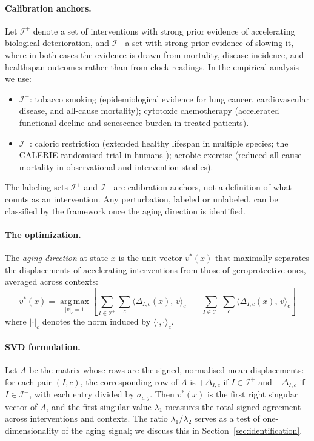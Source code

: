 \paragraph{Calibration anchors.}
Let $\mathcal{I}^+$ denote a set of interventions with strong prior evidence of
accelerating biological deterioration, and $\mathcal{I}^-$ a set with strong prior
evidence of slowing it, where in both cases the evidence is drawn from mortality,
disease incidence, and healthspan outcomes rather than from clock readings. In the
empirical analysis we use:
\begin{itemize}
  \item $\mathcal{I}^+$: tobacco smoking (epidemiological evidence for lung cancer,
    cardiovascular disease, and all-cause mortality); cytotoxic chemotherapy
    (accelerated functional decline and senescence burden in treated patients).
  \item $\mathcal{I}^-$: caloric restriction (extended healthy lifespan in multiple
    species; the CALERIE randomised trial in humans \cite{belsky2023calerie});
    aerobic exercise (reduced all-cause mortality in observational and intervention
    studies).
\end{itemize}

The labeling sets $\mathcal{I}^+$ and $\mathcal{I}^-$ are calibration anchors, not
a definition of what counts as an intervention. Any perturbation, labeled or
unlabeled, can be classified by the framework once the aging direction is identified.

\paragraph{The optimization.}
The \emph{aging direction} at state $x$ is the unit vector $v^*(x)$ that maximally
separates the displacements of accelerating interventions from those of geroprotective
ones, averaged across contexts:
\begin{equation}
  v^*(x) = \operatorname*{arg\,max}_{|v|_c = 1}
  \left[
    \sum_{I \in \mathcal{I}^+} \sum_c \langle \Delta_{I,c}(x),\, v \rangle_c
    \;-\;
    \sum_{I \in \mathcal{I}^-} \sum_c \langle \Delta_{I,c}(x),\, v \rangle_c
  \right]
  \label{eq:agingdir}
\end{equation}
where $|\cdot|_c$ denotes the norm induced by $\langle \cdot, \cdot \rangle_c$.

\paragraph{SVD formulation.}
Let $A$ be the matrix whose rows are the signed, normalised mean displacements:
for each pair $(I, c)$, the corresponding row of $A$ is $+\Delta_{I,c}$ if
$I \in \mathcal{I}^+$ and $-\Delta_{I,c}$ if $I \in \mathcal{I}^-$, with each
entry divided by $\sigma_{c,j}$. Then $v^*(x)$ is the first right singular vector
of $A$, and the first singular value $\lambda_1$ measures the total signed agreement
across interventions and contexts. The ratio $\lambda_1 / \lambda_2$ serves as a
test of one-dimensionality of the aging signal; we discuss this in
Section~\ref{sec:identification}.

